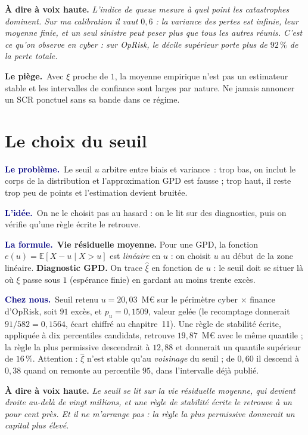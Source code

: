 \documentclass[11pt,a4paper]{article}
\newcommand{\lequoi}[1]{\smallskip\noindent\textcolor{navy}{\textbf{Le problème.}}\ #1\par}
\newcommand{\lidee}[1]{\smallskip\noindent\textcolor{navy}{\textbf{L'idée.}}\ #1\par}
\newcommand{\laformule}[1]{\smallskip\noindent\textcolor{navy}{\textbf{La formule.}}\ #1\par}
\newcommand{\cheznous}[1]{\smallskip\noindent\textcolor{navy}{\textbf{Chez nous.}}\ #1\par}
\newcommand{\lepiege}[1]{\smallskip\noindent\textcolor{accent}{\textbf{Le piège.}}\ #1\par}
\newcommand{\laphrase}[1]{\begin{phrasebox}\textbf{À dire à voix haute.} \emph{#1}\end{phrasebox}}
\begin{document}
\laphrase{L'indice de queue mesure à quel point les catastrophes dominent. Sur ma calibration il
vaut $0{,}6$ : la variance des pertes est infinie, leur moyenne finie, et un seul sinistre peut
peser plus que tous les autres réunis. C'est ce qu'on observe en cyber : sur OpRisk, le décile
supérieur porte plus de $92\,\%$ de la perte totale.}

\lepiege{Avec $\xi$ proche de $1$, la moyenne empirique n'est pas un estimateur stable et
les intervalles de confiance sont larges par nature. Ne jamais annoncer un SCR ponctuel
sans sa bande dans ce régime.}

\section{Le choix du seuil}

\lequoi{Le seuil $u$ arbitre entre biais et variance~: trop bas, on inclut le corps de la
distribution et l'approximation GPD est fausse ; trop haut, il reste trop peu de points et
l'estimation devient bruitée.}

\lidee{On ne le choisit pas au hasard : on le lit sur des diagnostics, puis on vérifie qu'une
règle écrite le retrouve.}

\laformule{\textbf{Vie résiduelle moyenne.} Pour une GPD, la fonction
$e(u)=\mathbb{E}[X-u\mid X>u]$ est \emph{linéaire} en $u$ : on choisit $u$ au début de la zone
linéaire. \textbf{Diagnostic GPD.} On trace $\hat\xi$ en fonction de $u$ : le seuil doit se
situer là où $\xi$ passe sous $1$ (espérance finie) en gardant au moins trente excès.}

\cheznous{Seuil retenu $u=20{,}03$~M\euro{} sur le périmètre cyber $\times$ finance d'OpRisk, soit
$91$ excès, et $p_u=0{,}1509$, valeur gelée (le recomptage donnerait $91/582=0{,}1564$, écart
chiffré au chapitre~11). Une règle de stabilité écrite, appliquée à dix percentiles candidats,
retrouve $19{,}87$~M\euro{} avec le même quantile ; la règle la plus permissive descendrait à
$12{,}88$ et donnerait un quantile supérieur de $16\,\%$. Attention : $\hat\xi$ n'est stable qu'au
\emph{voisinage} du seuil ; de $0{,}60$ il descend à $0{,}38$ quand on remonte au percentile $95$,
dans l'intervalle déjà publié.}

\laphrase{Le seuil se lit sur la vie résiduelle moyenne, qui devient droite au-delà de vingt
millions, et une règle de stabilité écrite le retrouve à un pour cent près. Et il ne m'arrange pas :
la règle la plus permissive donnerait un capital plus élevé.}
\end{document}
